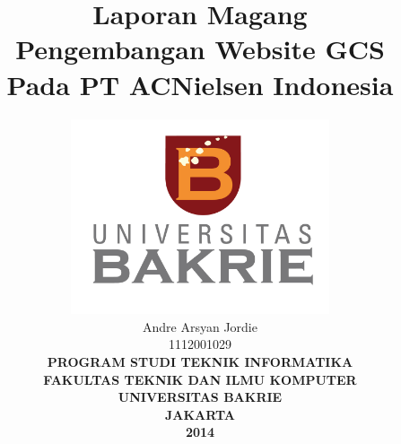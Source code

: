 \documentclass[12pt]{report}
\begin{document}
\title{\textbf{Laporan Magang\\ %
Pengembangan Website GCS \\
 Pada PT ACNielsen Indonesia}}
\author{
\includegraphics[width=3in]{img/logo-ub.jpg}\\[1ex]
Andre Arsyan Jordie\\
1112001029\\[8ex] %
\textbf{PROGRAM STUDI TEKNIK INFORMATIKA}\\
\textbf{FAKULTAS TEKNIK DAN ILMU KOMPUTER}\\
\textbf{UNIVERSITAS BAKRIE}\\
\textbf{JAKARTA}\\
\textbf{2014}
}
\date{} %
\maketitle %

 


\tableofcontents %

\cleardoublepage{} %



\end{document}

